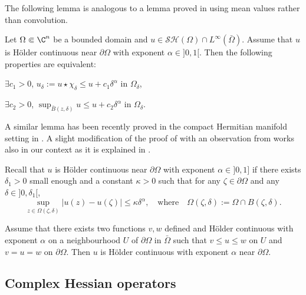 The following lemma is analogous to a lemma proved in \cite{GKZ08} using mean values rather than convolution.
\begin{lemma} \label{lem:sup-mean} Let $\Omega \Subset \C^n$ be a bounded domain and $u \in \mathcal{SH} (\Omega) \cap L^{\infty} ({\bar \Omega})$. Assume that $u$ is Hölder continuous near $\partial\Omega$ with exponent $\alpha \in{} ]0,1[$. Then the following properties are equivalent:
\begin{enumeratei}
\item
$\exists c_1 >0$, ${ u}_\delta:= u \star \chi_\delta \leq u + c_1 \delta^{\alpha}$ in $\Omega_\delta$,

\item
$\exists c_2 >0$, $\sup_{\bar B(z,\delta)} u \leq u + c_2 \delta^{\alpha}$ in $\Omega_\delta$.
\end{enumeratei}
\end{lemma}
A similar lemma has been recently proved in the compact Hermitian manifold setting in \cite{LPT20}.
A slight modification of the proof of \cite{GKZ08} with an observation from \cite{LPT20} works also in our context as it is explained in \cite{Ze20}.

\begin{remark} \label{rem:HolderBoundary} Recall that $u$ is Hölder continuous near $\partial\Omega$ with exponent $\alpha \in{}]0,1]$ if there exists $\delta_1 > 0$ small enough and a constant $\kappa > 0$ such that for any $\zeta \in \partial \Omega$ and any $\delta\in{}]0,\delta_1[$,
\[
\sup_{z \in \Omega (\zeta,\delta)} \vert u (z) - u (\zeta) \vert \leq \kappa \delta^\alpha, \quad\text{where}\quad \Omega(\zeta,\delta):= \Omega \cap B (\zeta,\delta).
\]

Assume that there exists two functions $v, w $ defined and Hölder continuous with exponent $\alpha $ on a neighbourhood $ U$ of $\partial \Omega$ in $\bar \Omega$ such that
$v \leq u \leq w$ on $ U$ and $v = u = w$ on $\partial \Omega$. Then $u$ is Hölder continuous with exponent $\alpha $ near $\partial \Omega$.
\end{remark}

\subsection{Complex Hessian operators}

